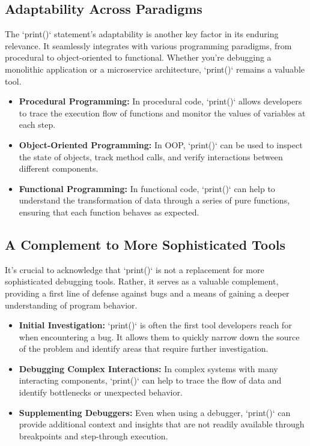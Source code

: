 \documentclass{article}
\begin{document}
{{{{\subsection*{Adaptability Across Paradigms}

The `print()` statement's adaptability is another key factor in its enduring relevance. It seamlessly integrates with various programming paradigms, from procedural to object-oriented to functional. Whether you're debugging a monolithic application or a microservice architecture, `print()` remains a valuable tool.

\begin{itemize}
    \item \textbf{Procedural Programming:} In procedural code, `print()` allows developers to trace the execution flow of functions and monitor the values of variables at each step.
    \item \textbf{Object-Oriented Programming:} In OOP, `print()` can be used to inspect the state of objects, track method calls, and verify interactions between different components.
    \item \textbf{Functional Programming:} In functional code, `print()` can help to understand the transformation of data through a series of pure functions, ensuring that each function behaves as expected.
\end{itemize}

\subsection*{A Complement to More Sophisticated Tools}

It's crucial to acknowledge that `print()` is not a replacement for more sophisticated debugging tools. Rather, it serves as a valuable complement, providing a first line of defense against bugs and a means of gaining a deeper understanding of program behavior.

\begin{itemize}
    \item \textbf{Initial Investigation:} `print()` is often the first tool developers reach for when encountering a bug. It allows them to quickly narrow down the source of the problem and identify areas that require further investigation.
    \item \textbf{Debugging Complex Interactions:} In complex systems with many interacting components, `print()` can help to trace the flow of data and identify bottlenecks or unexpected behavior.
    \item \textbf{Supplementing Debuggers:} Even when using a debugger, `print()` can provide additional context and insights that are not readily available through breakpoints and step-through execution.
\end{itemize}

}}}}
\end{document}
